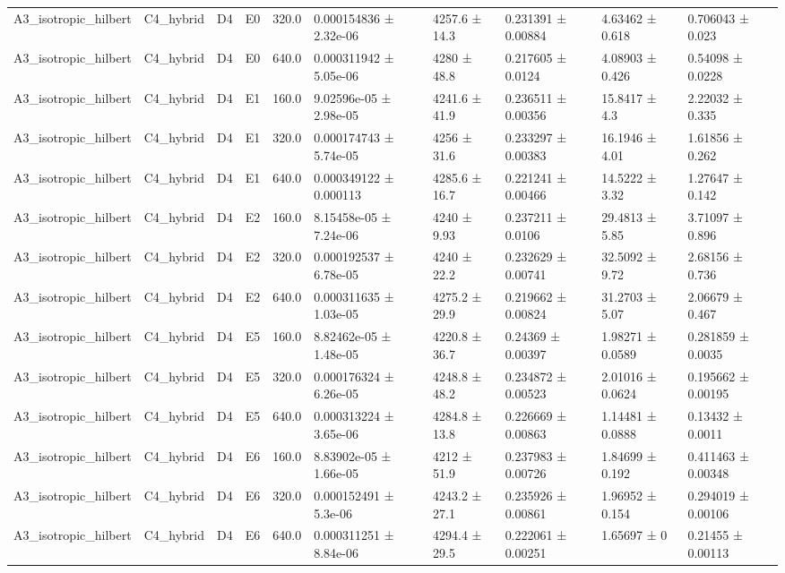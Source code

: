 \begin{table}
\begin{tabular}{llllllllll}
A3\_isotropic\_hilbert & C4\_hybrid & D4 & E0 & 320.0 & 0.000154836 ± 2.32e-06 & 4257.6 ± 14.3 & 0.231391 ± 0.00884 & 4.63462 ± 0.618 & 0.706043 ± 0.023 \\
A3\_isotropic\_hilbert & C4\_hybrid & D4 & E0 & 640.0 & 0.000311942 ± 5.05e-06 & 4280 ± 48.8 & 0.217605 ± 0.0124 & 4.08903 ± 0.426 & 0.54098 ± 0.0228 \\
A3\_isotropic\_hilbert & C4\_hybrid & D4 & E1 & 160.0 & 9.02596e-05 ± 2.98e-05 & 4241.6 ± 41.9 & 0.236511 ± 0.00356 & 15.8417 ± 4.3 & 2.22032 ± 0.335 \\
A3\_isotropic\_hilbert & C4\_hybrid & D4 & E1 & 320.0 & 0.000174743 ± 5.74e-05 & 4256 ± 31.6 & 0.233297 ± 0.00383 & 16.1946 ± 4.01 & 1.61856 ± 0.262 \\
A3\_isotropic\_hilbert & C4\_hybrid & D4 & E1 & 640.0 & 0.000349122 ± 0.000113 & 4285.6 ± 16.7 & 0.221241 ± 0.00466 & 14.5222 ± 3.32 & 1.27647 ± 0.142 \\
A3\_isotropic\_hilbert & C4\_hybrid & D4 & E2 & 160.0 & 8.15458e-05 ± 7.24e-06 & 4240 ± 9.93 & 0.237211 ± 0.0106 & 29.4813 ± 5.85 & 3.71097 ± 0.896 \\
A3\_isotropic\_hilbert & C4\_hybrid & D4 & E2 & 320.0 & 0.000192537 ± 6.78e-05 & 4240 ± 22.2 & 0.232629 ± 0.00741 & 32.5092 ± 9.72 & 2.68156 ± 0.736 \\
A3\_isotropic\_hilbert & C4\_hybrid & D4 & E2 & 640.0 & 0.000311635 ± 1.03e-05 & 4275.2 ± 29.9 & 0.219662 ± 0.00824 & 31.2703 ± 5.07 & 2.06679 ± 0.467 \\
A3\_isotropic\_hilbert & C4\_hybrid & D4 & E5 & 160.0 & 8.82462e-05 ± 1.48e-05 & 4220.8 ± 36.7 & 0.24369 ± 0.00397 & 1.98271 ± 0.0589 & 0.281859 ± 0.0035 \\
A3\_isotropic\_hilbert & C4\_hybrid & D4 & E5 & 320.0 & 0.000176324 ± 6.26e-05 & 4248.8 ± 48.2 & 0.234872 ± 0.00523 & 2.01016 ± 0.0624 & 0.195662 ± 0.00195 \\
A3\_isotropic\_hilbert & C4\_hybrid & D4 & E5 & 640.0 & 0.000313224 ± 3.65e-06 & 4284.8 ± 13.8 & 0.226669 ± 0.00863 & 1.14481 ± 0.0888 & 0.13432 ± 0.0011 \\
A3\_isotropic\_hilbert & C4\_hybrid & D4 & E6 & 160.0 & 8.83902e-05 ± 1.66e-05 & 4212 ± 51.9 & 0.237983 ± 0.00726 & 1.84699 ± 0.192 & 0.411463 ± 0.00348 \\
A3\_isotropic\_hilbert & C4\_hybrid & D4 & E6 & 320.0 & 0.000152491 ± 5.3e-06 & 4243.2 ± 27.1 & 0.235926 ± 0.00861 & 1.96952 ± 0.154 & 0.294019 ± 0.00106 \\
A3\_isotropic\_hilbert & C4\_hybrid & D4 & E6 & 640.0 & 0.000311251 ± 8.84e-06 & 4294.4 ± 29.5 & 0.222061 ± 0.00251 & 1.65697 ± 0 & 0.21455 ± 0.00113 \\

\end{tabular}
\end{table}
